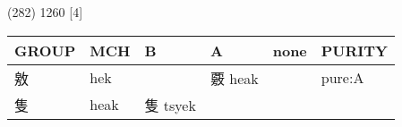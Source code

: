 \documentclass[14pt,a4paper]{scrartcl}
\begin{document}
(282) 1260 {[}4{]}

\begin{longtable}[c]{@{}llllll@{}}
\toprule
\begin{minipage}[b]{0.14\columnwidth}\raggedright\strut
GROUP
\strut\end{minipage} &
\begin{minipage}[b]{0.14\columnwidth}\raggedright\strut
MCH
\strut\end{minipage} &
\begin{minipage}[b]{0.14\columnwidth}\raggedright\strut
B
\strut\end{minipage} &
\begin{minipage}[b]{0.14\columnwidth}\raggedright\strut
A
\strut\end{minipage} &
\begin{minipage}[b]{0.14\columnwidth}\raggedright\strut
none
\strut\end{minipage} &
\begin{minipage}[b]{0.14\columnwidth}\raggedright\strut
PURITY
\strut\end{minipage}\tabularnewline
\midrule
\endhead
\begin{minipage}[t]{0.14\columnwidth}\raggedright\strut
敫
\strut\end{minipage} &
\begin{minipage}[t]{0.14\columnwidth}\raggedright\strut
hek
\strut\end{minipage} &
\begin{minipage}[t]{0.14\columnwidth}\raggedright\strut
\strut\end{minipage} &
\begin{minipage}[t]{0.14\columnwidth}\raggedright\strut
覈 heak
\strut\end{minipage} &
\begin{minipage}[t]{0.14\columnwidth}\raggedright\strut
\strut\end{minipage} &
\begin{minipage}[t]{0.14\columnwidth}\raggedright\strut
pure:A
\strut\end{minipage}\tabularnewline
\begin{minipage}[t]{0.14\columnwidth}\raggedright\strut
隻
\strut\end{minipage} &
\begin{minipage}[t]{0.14\columnwidth}\raggedright\strut
heak
\strut\end{minipage} &
\begin{minipage}[t]{0.14\columnwidth}\raggedright\strut
隻 tsyek
\strut\end{minipage} &

\end{longtable}
\end{document}
